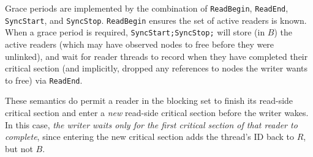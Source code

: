 Grace periods are implemented by the combination of \lstinline|ReadBegin|, \lstinline|ReadEnd|, \lstinline|SyncStart|, and \lstinline|SyncStop|.
\lstinline|ReadBegin| ensures the set of active readers is known.  When a grace period is required, \lstinline|SyncStart;SyncStop;| will store (in $B$) the active readers (which may have observed nodes to free before they were unlinked), and wait for reader threads to record when they have completed their critical section (and implicitly, dropped any references to nodes the writer wants to free) via \lstinline|ReadEnd|.

These semantics do permit a reader in the blocking set to finish its read-side critical section and enter a \emph{new} read-side critical section before the writer wakes.  In this case, \emph{the writer waits only for the first critical section of that reader to complete}, since entering the new critical section adds the thread's ID back to $R$, but not $B$.

